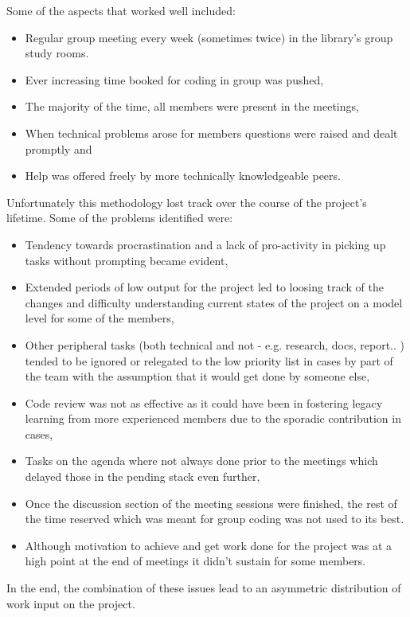 Some of the aspects that worked well included:
\begin{itemize}
	\item Regular group meeting every week (sometimes twice) in the library's group study rooms.
	\item Ever increasing time booked for coding in group was pushed,
	\item The majority of the time, all members were present in the meetings,
	\item When technical problems arose for members questions were raised and dealt promptly and
	\item Help was offered freely by more technically knowledgeable peers.
\end{itemize}

Unfortunately this methodology lost track over the course of the project's lifetime. Some of the problems identified were:
\begin{itemize}
    \item Tendency towards procrastination and a lack of pro-activity in picking up tasks without prompting became evident,
    \item Extended periods of low output for the project led to loosing track of the changes and difficulty understanding current states of the project on a model level for some of the members,
    \item Other peripheral tasks (both technical and not - e.g. research, docs, report.. ) tended to be ignored or relegated to the low priority list in cases by part of the team with the assumption that it would get done by someone else,
    \item Code review was not as effective as it could have been in fostering legacy learning from more experienced members due to the sporadic contribution in cases,
    \item Tasks on the agenda where not always done prior to the meetings which delayed those in the pending stack even further,
    \item Once the discussion section of the meeting sessions were finished, the rest of the time reserved which was meant for group coding was not used to its best.
    \item Although motivation to achieve and get work done for the project was at a high point at the end of meetings it didn't sustain for some members.
\end{itemize}

In the end, the combination of these issues lead to an asymmetric distribution of work input on the project.


